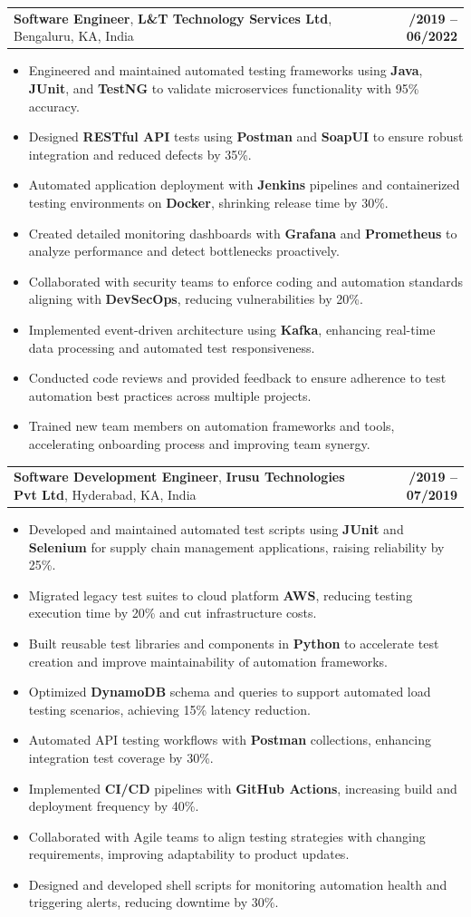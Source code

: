 \documentclass[letterpaper,11pt]{article}
\makeatletter
\newcommand{\resumeItem}[1]{
  \item\footnotesize{
    {#1 \vspace{-2pt}}
  }
}
\newcommand{\resumeSubheading}[4]{
  \vspace{-2pt}\item
    \begin{tabular*}{1.0\textwidth}[t]{l@{\extracolsep{\fill}}r}
      \textbf{\fontsize{10pt}{14pt}\selectfont #3}, \textbf{\fontsize{10pt}{14pt}\selectfont #1}, \fontsize{10pt}{14pt}\selectfont #4 & \textbf{\fontsize{10pt}{14pt}\selectfont #2} \\
    \end{tabular*}\vspace{-7pt}
}
\newcommand{\resumeItemListStart}{\begin{itemize}[leftmargin=*]}
\newcommand{\resumeItemListEnd}{\end{itemize}\vspace{-5pt}}
\makeatother
\begin{document}
    \resumeSubheading
        {L\&T Technology Services Ltd}{08/2019 -- 06/2022}
        {Software Engineer}{Bengaluru, KA, India}
      \resumeItemListStart
        \resumeItem{Engineered and maintained automated testing frameworks using \textbf{Java}, \textbf{JUnit}, and \textbf{TestNG} to validate microservices functionality with 95\% accuracy.}
        \resumeItem{Designed \textbf{RESTful API} tests using \textbf{Postman} and \textbf{SoapUI} to ensure robust integration and reduced defects by 35\%.}
        \resumeItem{Automated application deployment with \textbf{Jenkins} pipelines and containerized testing environments on \textbf{Docker}, shrinking release time by 30\%.}
        \resumeItem{Created detailed monitoring dashboards with \textbf{Grafana} and \textbf{Prometheus} to analyze performance and detect bottlenecks proactively.}
        \resumeItem{Collaborated with security teams to enforce coding and automation standards aligning with \textbf{DevSecOps}, reducing vulnerabilities by 20\%.}
        \resumeItem{Implemented event-driven architecture using \textbf{Kafka}, enhancing real-time data processing and automated test responsiveness.}
        \resumeItem{Conducted code reviews and provided feedback to ensure adherence to test automation best practices across multiple projects.}
        \resumeItem{Trained new team members on automation frameworks and tools, accelerating onboarding process and improving team synergy.}
      \resumeItemListEnd

    \resumeSubheading
        {Irusu Technologies Pvt Ltd}{01/2019 -- 07/2019}
        {Software Development Engineer}{Hyderabad, KA, India}
      \resumeItemListStart
        \resumeItem{Developed and maintained automated test scripts using \textbf{JUnit} and \textbf{Selenium} for supply chain management applications, raising reliability by 25\%.}
        \resumeItem{Migrated legacy test suites to cloud platform \textbf{AWS}, reducing testing execution time by 20\% and cut infrastructure costs.}
        \resumeItem{Built reusable test libraries and components in \textbf{Python} to accelerate test creation and improve maintainability of automation frameworks.}
        \resumeItem{Optimized \textbf{DynamoDB} schema and queries to support automated load testing scenarios, achieving 15\% latency reduction.}
        \resumeItem{Automated API testing workflows with \textbf{Postman} collections, enhancing integration test coverage by 30\%.}
        \resumeItem{Implemented \textbf{CI/CD} pipelines with \textbf{GitHub Actions}, increasing build and deployment frequency by 40\%.}
        \resumeItem{Collaborated with Agile teams to align testing strategies with changing requirements, improving adaptability to product updates.}
        \resumeItem{Designed and developed shell scripts for monitoring automation health and triggering alerts, reducing downtime by 30\%.}
      \resumeItemListEnd
\end{document}
